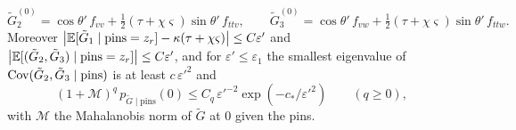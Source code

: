 \begin{lemma}
\begin{enumerate}[(a)]
\begin{equation}\label{eq:selection-Nlim}
\tilde G^{(0)}_2=\cos\theta'\,f_{vv}+\tfrac12(\tau+\chi\varsigma)\sin\theta'\,f_{ttv},\qquad\tilde G^{(0)}_3=\cos\theta'\,f_{vw}+\tfrac12(\tau+\chi\varsigma)\sin\theta'\,f_{ttw}.
\end{equation}
Moreover $\bigl|\mathbb E[\tilde G_1\mid\text{pins}=z_r]-\kappa(\tau+\chi\varsigma)\bigr|\le C\varepsilon'$ and $\bigl|\mathbb E[(\tilde G_2,\tilde G_3)\mid\text{pins}=z_r]\bigr|\le C\varepsilon'$, and for $\varepsilon'\le\varepsilon_1$ the smallest eigenvalue of $\operatorname{Cov}(\tilde G_2,\tilde G_3\mid\text{pins})$ is at least $c\,\varepsilon'^2$ and
\[
(1+\mathcal M)^q\,p_{\tilde G\mid\text{pins}}(0)\le C_q\,\varepsilon'^{-2}\exp(-c_*/\varepsilon'^2)\qquad(q\ge0),
\]
with $\mathcal M$ the Mahalanobis norm of $\tilde G$ at $0$ given the pins.
\end{enumerate}
\end{lemma}

